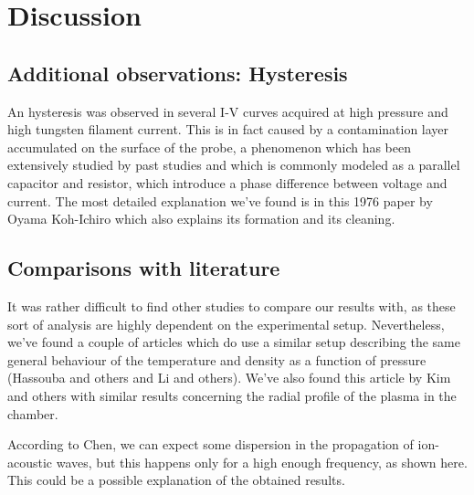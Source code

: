 \section{Discussion}

\subsection{Additional observations: Hysteresis}
An hysteresis was observed in several I-V curves acquired at high pressure and high tungsten filament current.
This is in fact caused by a contamination layer accumulated on the surface of the probe, a phenomenon which has been extensively studied by past studies and which is commonly modeled as a parallel capacitor and resistor, which introduce a phase difference between voltage and current.
The most detailed explanation we've found is in this 1976 paper by Oyama Koh-Ichiro
which also explains its formation and its cleaning.

\subsection{Comparisons with literature}
It was rather difficult to find other studies to compare our results with, as these sort of analysis are highly dependent on the experimental setup.
Nevertheless, we've found a couple of articles which do use a similar setup describing the same general behaviour of the temperature and density as a function of pressure (Hassouba and others and Li and others). 
We've also found this article by Kim and others with similar results concerning the radial profile of the plasma in the chamber.

According to Chen, we can expect some dispersion in the propagation of ion-acoustic waves, but this happens only for a high enough frequency, as shown here. This could be a possible explanation of the obtained results.

